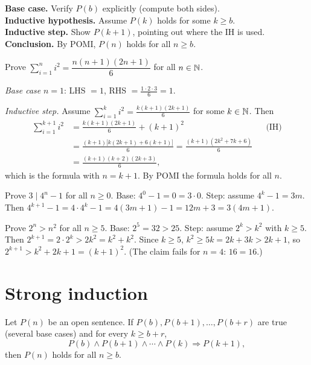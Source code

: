 \begin{important}[Template]
\textbf{Base case.} Verify $P(b)$ explicitly (compute both sides).\\
\textbf{Inductive hypothesis.} Assume $P(k)$ holds for some $k \ge b$.\\
\textbf{Inductive step.} Show $P(k+1)$, pointing out where the IH is used.\\
\textbf{Conclusion.} By POMI, $P(n)$ holds for all $n \ge b$.
\end{important}

\begin{example}
Prove $\sum_{i=1}^n i^2 = \dfrac{n(n+1)(2n+1)}{6}$ for all $n \in \mathbb{N}$.

\emph{Base case} $n = 1$: LHS $= 1$, RHS $= \frac{1\cdot 2\cdot 3}{6} = 1$.

\emph{Inductive step.} Assume $\sum_{i=1}^k i^2 = \frac{k(k+1)(2k+1)}{6}$ for some $k\in\mathbb{N}$. Then
\begin{align*}
\sum_{i=1}^{k+1} i^2 &= \frac{k(k+1)(2k+1)}{6} + (k+1)^2 &&\text{(IH)}\\
&= \frac{(k+1)\bigl[k(2k+1) + 6(k+1)\bigr]}{6} = \frac{(k+1)(2k^2 + 7k + 6)}{6}\\
&= \frac{(k+1)(k+2)(2k+3)}{6},
\end{align*}
which is the formula with $n = k+1$. By POMI the formula holds for all $n$.
\end{example}

\begin{example}[Divisibility]
Prove $3 \mid 4^n - 1$ for all $n \ge 0$.
Base: $4^0 - 1 = 0 = 3\cdot 0$. Step: assume $4^k - 1 = 3m$. Then
$4^{k+1} - 1 = 4\cdot 4^k - 1 = 4(3m + 1) - 1 = 12m + 3 = 3(4m+1)$.
\end{example}

\begin{example}
Prove $2^n > n^2$ for all $n \ge 5$.
Base: $2^5 = 32 > 25$. Step: assume $2^k > k^2$ with $k \ge 5$. Then
$2^{k+1} = 2\cdot 2^k > 2k^2 = k^2 + k^2$. Since $k \ge 5$, $k^2 \geq 5k = 2k + 3k > 2k + 1$, so
$2^{k+1} > k^2 + 2k + 1 = (k+1)^2$. (The claim fails for $n = 4$: $16 = 16$.)
\end{example}

\section{Strong induction}

\begin{theorem}
Let $P(n)$ be an open sentence. If $P(b), P(b+1),\dots,P(b + r)$ are true (several base cases)
and for every $k \ge b + r$,
\[ P(b)\wedge P(b+1)\wedge\cdots\wedge P(k) \Rightarrow P(k+1), \]
then $P(n)$ holds for all $n \ge b$.
\end{theorem}

